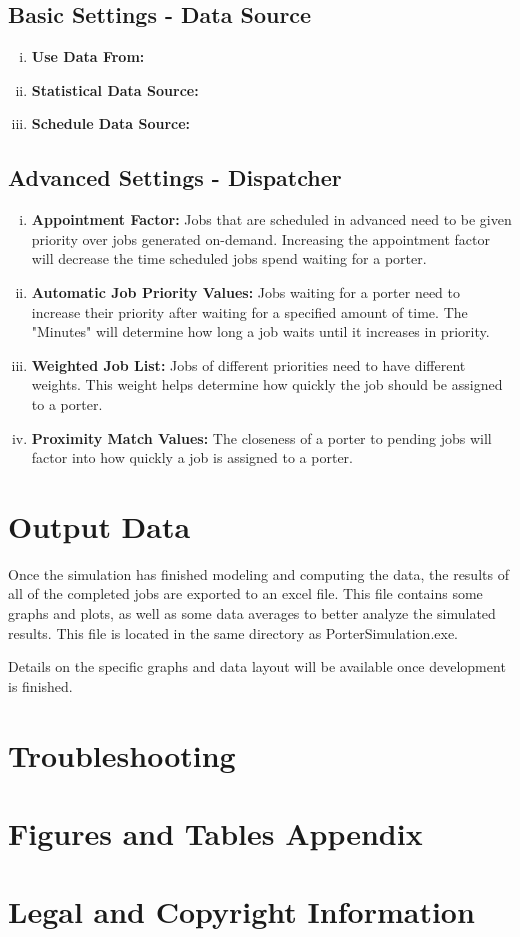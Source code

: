 \documentclass[paper=letter, fontsize=10pt]{scrartcl}
\numberwithin{equation}{section}		%
\numberwithin{figure}{section}			%
\numberwithin{table}{section}				%
\begin{document}
	\subsection{Basic Settings - Data Source}
	\begin{enumerate}[(i)]
		\item \textbf{Use Data From:}
		\item \textbf{Statistical Data Source:}
		\item \textbf{Schedule Data Source:}
	\end{enumerate}
	
	\subsection{Advanced Settings - Dispatcher}
	\begin{enumerate}[(i)]
		\item \textbf{Appointment Factor:} Jobs that are scheduled in advanced need to be given priority over jobs generated on-demand.  Increasing the appointment factor will decrease the time scheduled jobs spend waiting for a porter.
		\item \textbf{Automatic Job Priority Values:} Jobs waiting for a porter need to increase their priority after waiting for a specified amount of time.  The "Minutes" will determine how long a job waits until it increases in priority.
		\item \textbf{Weighted Job List:} Jobs of different priorities need to have different weights.  This weight helps determine how quickly the job should be assigned to a porter.
		\item \textbf{Proximity Match Values:} The closeness of a porter to pending jobs will factor into how quickly a job is assigned to a porter.
	\end{enumerate}
	
\section{Output Data}
Once the simulation has finished modeling and computing the data, the results of all of the completed jobs are exported to an excel file. This file contains some graphs and plots, as well as some data averages to better analyze the simulated results. This file is located in the same directory as PorterSimulation.exe. 

Details on the specific graphs and data layout will be available once development is finished.

\section{Troubleshooting}

\section{Figures and Tables Appendix}

\section{Legal and Copyright Information}


\end{document}
